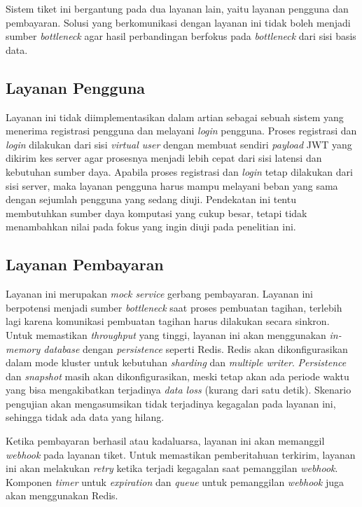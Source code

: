 Sistem tiket ini bergantung pada dua layanan lain, yaitu layanan pengguna dan pembayaran. Solusi yang berkomunikasi dengan layanan ini tidak boleh menjadi sumber \textit{bottleneck} agar hasil perbandingan berfokus pada \textit{bottleneck} dari sisi basis data.

\subsection{Layanan Pengguna}

Layanan ini tidak diimplementasikan dalam artian sebagai sebuah sistem yang menerima registrasi pengguna dan melayani \textit{login} pengguna. Proses registrasi dan \textit{login} dilakukan dari sisi \textit{virtual user} dengan membuat sendiri \textit{payload} JWT yang dikirim kes server agar prosesnya menjadi lebih cepat dari sisi latensi dan kebutuhan sumber daya. Apabila proses registrasi dan \textit{login} tetap dilakukan dari sisi server, maka layanan pengguna harus mampu melayani beban yang sama dengan sejumlah pengguna yang sedang diuji. Pendekatan ini tentu membutuhkan sumber daya komputasi yang cukup besar, tetapi tidak menambahkan nilai pada fokus yang ingin diuji pada penelitian ini.

\subsection{Layanan Pembayaran}

Layanan ini merupakan \textit{mock service} gerbang pembayaran. Layanan ini berpotensi menjadi sumber \textit{bottleneck} saat proses pembuatan tagihan, terlebih lagi karena komunikasi pembuatan tagihan harus dilakukan secara sinkron. Untuk memastikan \textit{throughput} yang tinggi, layanan ini akan menggunakan \textit{in-memory database} dengan \textit{persistence} seperti Redis. Redis akan dikonfigurasikan dalam mode kluster untuk kebutuhan \textit{sharding} dan \textit{multiple writer}. \textit{Persistence} dan \textit{snapshot} masih akan dikonfigurasikan, meski tetap akan ada periode waktu yang bisa mengakibatkan terjadinya \textit{data loss} (kurang dari satu detik). Skenario pengujian akan mengasumsikan tidak terjadinya kegagalan pada layanan ini, sehingga tidak ada data yang hilang.

Ketika pembayaran berhasil atau kadaluarsa, layanan ini akan memanggil \textit{webhook} pada layanan tiket. Untuk memastikan pemberitahuan terkirim, layanan ini akan melakukan \textit{retry} ketika terjadi kegagalan saat pemanggilan \textit{webhook}. Komponen \textit{timer} untuk \textit{expiration} dan \textit{queue} untuk pemanggilan \textit{webhook} juga akan menggunakan Redis.

